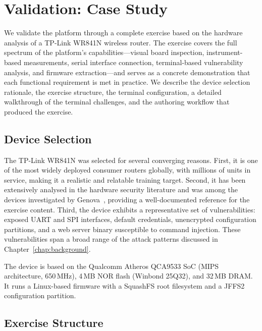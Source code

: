 \chapter{Validation: Case Study}\label{chap:casestudy}

We validate the \pcbctf{} platform through a complete exercise based on the hardware analysis of a TP-Link WR841N wireless router. The exercise covers the full spectrum of the platform's capabilities---visual board inspection, instrument-based measurements, serial interface connection, terminal-based vulnerability analysis, and firmware extraction---and serves as a concrete demonstration that each functional requirement is met in practice. We describe the device selection rationale, the exercise structure, the terminal configuration, a detailed walkthrough of the terminal challenges, and the authoring workflow that produced the exercise.

\section{Device Selection}\label{sec:device}

The TP-Link WR841N was selected for several converging reasons. First, it is one of the most widely deployed consumer routers globally, with millions of units in service, making it a realistic and relatable training target. Second, it has been extensively analysed in the hardware security literature and was among the devices investigated by Genova~\cite{genova2025}, providing a well-documented reference for the exercise content. Third, the device exhibits a representative set of vulnerabilities: exposed UART and SPI interfaces, default credentials, unencrypted configuration partitions, and a web server binary susceptible to command injection. These vulnerabilities span a broad range of the attack patterns discussed in Chapter~\ref{chap:background}.

The device is based on the Qualcomm Atheros QCA9533 SoC (MIPS architecture, 650\,MHz), 4\,MB NOR flash (Winbond 25Q32), and 32\,MB DRAM. It runs a Linux-based firmware with a SquashFS root filesystem and a JFFS2 configuration partition.

\section{Exercise Structure}\label{sec:exercise-structure}

